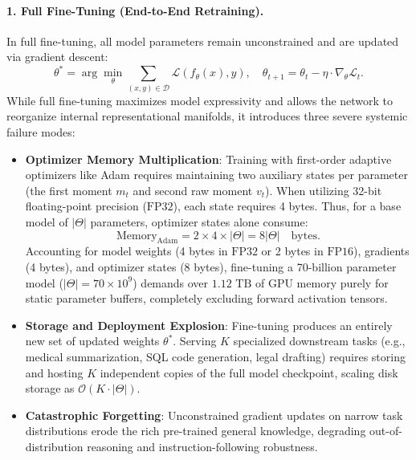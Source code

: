 \documentclass[../../../main.tex]{subfiles}
\begin{document}
\paragraph{1. Full Fine-Tuning (End-to-End Retraining).}
In full fine-tuning, all model parameters remain unconstrained and are updated via gradient descent:
\begin{equation}
\label{eq:full_ft_update}
\theta^* = \arg\min_\theta \sum_{(x, y) \in \mathcal{D}} \mathcal{L}(f_\theta(x), y), \quad \theta_{t+1} = \theta_t - \eta \cdot \nabla_\theta \mathcal{L}_t.
\end{equation}
While full fine-tuning maximizes model expressivity and allows the network to reorganize internal representational manifolds, it introduces three severe systemic failure modes:
\begin{itemize}
    \item \textbf{Optimizer Memory Multiplication}: Training with first-order adaptive optimizers like Adam requires maintaining two auxiliary states per parameter (the first moment $m_t$ and second raw moment $v_t$). When utilizing 32-bit floating-point precision ($\text{FP32}$), each state requires 4 bytes. Thus, for a base model of $|\Theta|$ parameters, optimizer states alone consume:
    \begin{equation}
    \label{eq:adam_optimizer_memory}
    \text{Memory}_{\text{Adam}} = 2 \times 4 \times |\Theta| = 8 |\Theta| \quad \text{bytes}.
    \end{equation}
    Accounting for model weights (4 bytes in $\text{FP32}$ or 2 bytes in $\text{FP16}$), gradients (4 bytes), and optimizer states (8 bytes), fine-tuning a 70-billion parameter model ($|\Theta| = 70 \times 10^9$) demands over $1.12\text{ TB}$ of GPU memory purely for static parameter buffers, completely excluding forward activation tensors.
    \item \textbf{Storage and Deployment Explosion}: Fine-tuning produces an entirely new set of updated weights $\theta^*$. Serving $K$ specialized downstream tasks (e.g., medical summarization, SQL code generation, legal drafting) requires storing and hosting $K$ independent copies of the full model checkpoint, scaling disk storage as $\mathcal{O}(K \cdot |\Theta|)$.
    \item \textbf{Catastrophic Forgetting}: Unconstrained gradient updates on narrow task distributions erode the rich pre-trained general knowledge, degrading out-of-distribution reasoning and instruction-following robustness.
\end{itemize}
\end{document}
